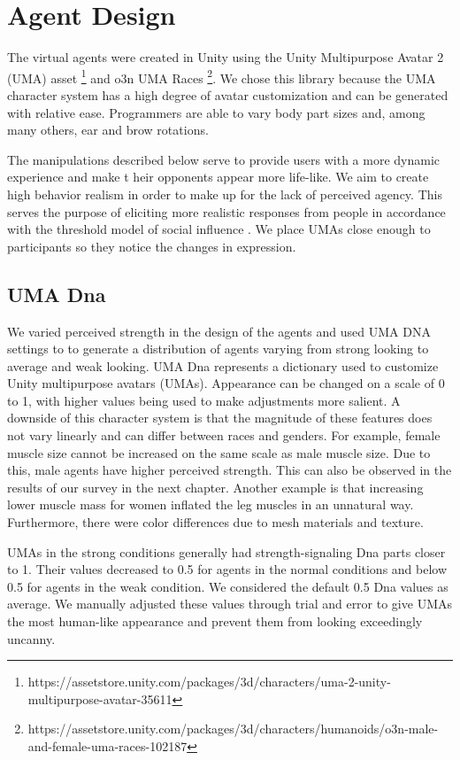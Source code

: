 \section{Agent Design}
The virtual agents were created in Unity using the Unity Multipurpose Avatar 2 (UMA) asset \footnote{https://assetstore.unity.com/packages/3d/characters/uma-2-unity-multipurpose-avatar-35611} and o3n UMA Races \footnote{https://assetstore.unity.com/packages/3d/characters/humanoids/o3n-male-and-female-uma-races-102187}. We chose this library because the UMA character system has a high degree of avatar customization and can be generated with relative ease. Programmers are able to vary body part sizes and, among many others, ear and brow rotations. 

The manipulations described below serve to provide users with a more dynamic experience and make t
heir opponents appear more life-like. We aim to create high behavior realism in order to make up for the lack of perceived agency. This serves the purpose of eliciting more realistic responses from people in accordance with the threshold model of social influence \cite{blascovich2002theoretical}. We place UMAs close enough to participants so they notice the changes in expression.




\subsection{UMA Dna}
We varied perceived strength in the design of the agents and used UMA DNA settings to to generate a distribution of agents varying from strong looking to average and weak looking. UMA Dna represents a dictionary used to customize Unity multipurpose avatars (UMAs). Appearance can be changed on a scale of 0 to 1, with higher values being used to make adjustments more salient. A downside of this character system is that the magnitude of these features does not vary linearly and can differ between races and genders. For example, female muscle size cannot be increased on the same scale as male muscle size. Due to this, male agents have higher perceived strength. This can also be observed in the results of our survey in the next chapter. Another example is that increasing lower muscle mass for women inflated the leg muscles in an unnatural way. Furthermore, there were color differences due to mesh materials and texture. 

UMAs in the strong conditions generally had strength-signaling Dna parts closer to 1. Their values decreased to 0.5 for agents in the normal conditions and below 0.5 for agents in the weak condition. We considered the default 0.5 Dna values as average. We manually adjusted these values through trial and error to give UMAs the most human-like appearance and prevent them from looking exceedingly uncanny.

